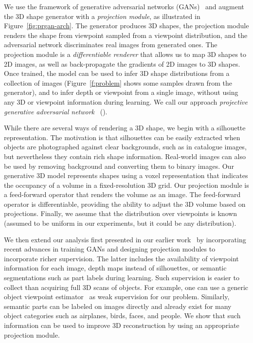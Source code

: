 We use the framework of generative adversarial
networks (GANs)~\cite{goodfellow2014generative} and augment the 3D shape
generator with a \emph{projection module}, as illustrated in Figure~\ref{fig:prgan-arch}.
The generator produces 3D shapes, the projection module
renders the shape from viewpoint sampled from a viewpoint distribution,
and the adversarial network discriminates real images from generated ones.
The projection module is a \emph{differentiable renderer} that allows us to map 3D
shapes to 2D images, as well as back-propagate the gradients of 2D
images to 3D shapes.
Once trained, the model can be used to infer 3D shape distributions
from a collection of images (Figure~\ref{f:problem} shows some samples
drawn from the generator), and to infer depth or viewpoint from a single
image, without using any 3D or viewpoint information during learning.
We call our approach \emph{projective generative adversarial network}
~(\prgan).


While there are several ways of rendering a 3D shape, we begin with a 
silhouette representation.
The motivation is that silhouettes can be easily
extracted when objects are photographed against clear backgrounds, such
as in catalogue images, but nevertheless they contain rich shape information.
Real-world images can also be used by removing background and converting them to
binary images. 
Our generative 3D model represents shapes using a voxel representation that indicates
the occupancy of a volume in a fixed-resolution 3D grid.
Our projection module is a feed-forward operator that
renders the volume as an image.
The feed-forward operator is differentiable, providing
the ability to adjust the 3D volume based on projections. 
Finally, we assume that the distribution over viewpoints
is known (assumed to be uniform in our experiments, but it could be any
distribution).

We then extend our analysis first presented in our earlier
work~\cite{prgan} by incorporating recent advances in training GANs and
designing projection modules to incorporate richer supervision.
The latter includes the availability of viewpoint information for
each image, depth maps instead of silhouettes, or semantic
segmentations such as part labels during learning.
Such supervision is easier to collect than acquiring full 3D scans of
objects.
For example, one can use a generic object viewpoint
estimator~\cite{su2015render} as weak supervision for our problem.
Similarly, semantic parts can be labeled on images directly and
already exist for many object categories such as airplanes, birds,
faces, and people.
We show that such information can be used to improve 3D reconstruction
by using an appropriate projection module.

